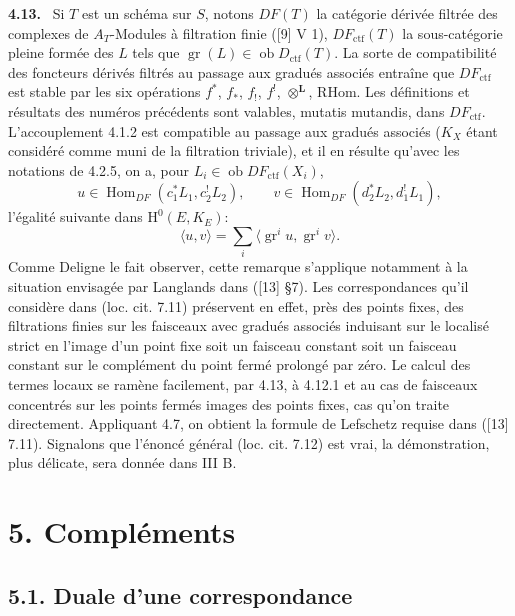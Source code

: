 \documentclass[11pt]{article}
\newenvironment{statement}[1]{\par\medskip\noindent\textbf{#1.}\ }{\par\medskip}
\renewcommand{\H}{\mathrm{H}}
\DeclareMathOperator{\Hom}{Hom}
\newcommand{\ob}{\operatorname{ob}}
\providecommand{\RHom}{\mathrm{RHom}}
\providecommand{\Dctf}{D_{\mathrm{ctf}}}
\providecommand{\ctf}{\mathrm{ctf}}
\providecommand{\gr}{\operatorname{gr}}
\providecommand{\Dctf}{D_{\mathrm{ctf}}}
\providecommand{\RHom}{\mathrm{RHom}}
\providecommand{\Hom}{\operatorname{Hom}}
\providecommand{\ob}{\operatorname{ob}}
\providecommand{\gr}{\operatorname{gr}}
\providecommand{\gr}{\operatorname{gr}}
\providecommand{\RHom}{\mathrm R\mathcal{H}om}
\providecommand{\RHom}{\mathrm{RHom}}
\providecommand{\Hom}{\operatorname{Hom}}
\begin{document}
\begin{statement}{4.13}
Si $T$ est un schéma sur $S$, notons $DF(T)$ la catégorie dérivée filtrée des complexes de $A_T$-Modules à filtration finie ([9] V 1), $DF_{\ctf}(T)$ la sous-catégorie pleine formée des $L$ tels que $\gr(L)\in\ob\Dctf(T)$. La sorte de compatibilité des foncteurs dérivés filtrés au passage aux gradués associés entraîne que $DF_{\ctf}$ est stable par les six opérations $f^*$, $f_*$, $f_!$, $f^!$, $\otimes^{\mathbf L}$, $\RHom$. Les définitions et résultats des numéros précédents sont valables, mutatis mutandis, dans $DF_{\ctf}$. L'accouplement 4.1.2 est compatible au passage aux gradués associés ($K_X$ étant considéré comme muni de la filtration triviale), et il en résulte qu'avec les notations de 4.2.5, on a, pour $L_i\in\ob DF_{\ctf}(X_i)$,
\[
u\in\Hom_{DF}(c_1^*L_1,c_2^!L_2),\qquad
v\in\Hom_{DF}(d_2^*L_2,d_1^!L_1),
\]
l'égalité suivante dans $\H^0(E,K_E)$:
\begin{equation}
\tag{4.13.1}
\langle u,v\rangle=\sum_i\langle \gr^i u,\gr^i v\rangle.
\end{equation}
Comme Deligne le fait observer, cette remarque s'applique notamment à la situation envisagée par Langlands dans ([13] §7). Les correspondances qu'il considère dans (loc. cit. 7.11) préservent en effet, près des points fixes, des filtrations finies sur les faisceaux avec gradués associés induisant sur le localisé strict en l'image d'un point fixe soit un faisceau constant soit un faisceau constant sur le complément du point fermé prolongé par zéro. Le calcul des termes locaux se ramène facilement, par 4.13, à 4.12.1 et au cas de faisceaux concentrés sur les points fermés images des points fixes, cas qu'on traite directement. Appliquant 4.7, on obtient la formule de Lefschetz requise dans ([13] 7.11). Signalons que l'énoncé général (loc. cit. 7.12) est vrai, la démonstration, plus délicate, sera donnée dans III B.
\end{statement}



\section*{5. Compléments}

\subsection*{5.1. Duale d'une correspondance}
\end{document}
